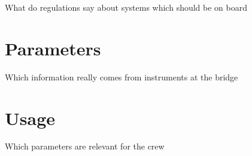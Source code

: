What do regulations say about systems which should be on board

\section{Parameters}
Which information really comes from instruments at the bridge

\section{Usage}
Which parameters are relevant for the crew